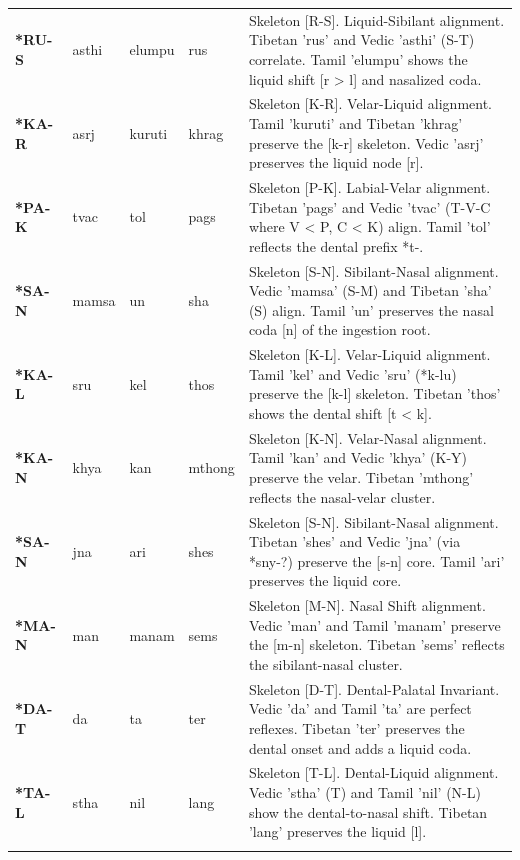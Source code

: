 \begin{longtable}{p{} p{} p{} p{} p{}}
\addlinespace[10pt]
\textbf{*RU-S} & asthi & elumpu & rus & \small Skeleton [R-S]. Liquid-Sibilant alignment. Tibetan 'rus' and Vedic 'asthi' (S-T) correlate. Tamil 'elumpu' shows the liquid shift [r > l] and nasalized coda. \\ 
\addlinespace[10pt]
\textbf{*KA-R} & asrj & kuruti & khrag & \small Skeleton [K-R]. Velar-Liquid alignment. Tamil 'kuruti' and Tibetan 'khrag' preserve the [k-r] skeleton. Vedic 'asrj' preserves the liquid node [r]. \\ 
\addlinespace[10pt]
\textbf{*PA-K} & tvac & tol & pags & \small Skeleton [P-K]. Labial-Velar alignment. Tibetan 'pags' and Vedic 'tvac' (T-V-C where V < P, C < K) align. Tamil 'tol' reflects the dental prefix *t-. \\ 
\addlinespace[10pt]
\textbf{*SA-N} & mamsa & un & sha & \small Skeleton [S-N]. Sibilant-Nasal alignment. Vedic 'mamsa' (S-M) and Tibetan 'sha' (S) align. Tamil 'un' preserves the nasal coda [n] of the ingestion root. \\ 
\addlinespace[10pt]
\textbf{*KA-L} & sru & kel & thos & \small Skeleton [K-L]. Velar-Liquid alignment. Tamil 'kel' and Vedic 'sru' (*k-lu) preserve the [k-l] skeleton. Tibetan 'thos' shows the dental shift [t < k]. \\ 
\addlinespace[10pt]
\textbf{*KA-N} & khya & kan & mthong & \small Skeleton [K-N]. Velar-Nasal alignment. Tamil 'kan' and Vedic 'khya' (K-Y) preserve the velar. Tibetan 'mthong' reflects the nasal-velar cluster. \\ 
\addlinespace[10pt]
\textbf{*SA-N} & jna & ari & shes & \small Skeleton [S-N]. Sibilant-Nasal alignment. Tibetan 'shes' and Vedic 'jna' (via *sny-?) preserve the [s-n] core. Tamil 'ari' preserves the liquid core. \\ 
\addlinespace[10pt]
\textbf{*MA-N} & man & manam & sems & \small Skeleton [M-N]. Nasal Shift alignment. Vedic 'man' and Tamil 'manam' preserve the [m-n] skeleton. Tibetan 'sems' reflects the sibilant-nasal cluster. \\ 
\addlinespace[10pt]
\textbf{*DA-T} & da & ta & ter & \small Skeleton [D-T]. Dental-Palatal Invariant. Vedic 'da' and Tamil 'ta' are perfect reflexes. Tibetan 'ter' preserves the dental onset and adds a liquid coda. \\ 
\addlinespace[10pt]
\textbf{*TA-L} & stha & nil & lang & \small Skeleton [T-L]. Dental-Liquid alignment. Vedic 'stha' (T) and Tamil 'nil' (N-L) show the dental-to-nasal shift. Tibetan 'lang' preserves the liquid [l]. \\ 
\addlinespace[10pt]

\end{longtable}
